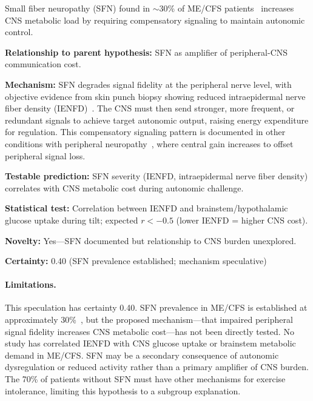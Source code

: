 \begin{speculation}
\label{spec:sfn-interface}
Small fiber neuropathy (SFN) found in $\sim$30\% of ME/CFS patients~\cite{Azcue2025sfn} increases CNS metabolic load by requiring compensatory signaling to maintain autonomic control.

\textbf{Relationship to parent hypothesis:} SFN as amplifier of peripheral-CNS communication cost.

\textbf{Mechanism:} SFN degrades signal fidelity at the peripheral nerve level, with objective evidence from skin punch biopsy showing reduced intraepidermal nerve fiber density (IENFD)~\cite{Oaklander2013sfn}. The CNS must then send stronger, more frequent, or redundant signals to achieve target autonomic output, raising energy expenditure for regulation. This compensatory signaling pattern is documented in other conditions with peripheral neuropathy~\cite{Oaklander2016autoimmuneSFN}, where central gain increases to offset peripheral signal loss.

\textbf{Testable prediction:} SFN severity (IENFD, intraepidermal nerve fiber density) correlates with CNS metabolic cost during autonomic challenge.

\textbf{Statistical test:} Correlation between IENFD and brainstem/hypothalamic glucose uptake during tilt; expected $r < -0.5$ (lower IENFD = higher CNS cost).

\textbf{Novelty:} Yes---SFN documented but relationship to CNS burden unexplored.

\textbf{Certainty:} 0.40 (SFN prevalence established; mechanism speculative)

\paragraph{Limitations.}
This speculation has certainty 0.40. SFN prevalence in ME/CFS is established at approximately 30\%~\cite{Azcue2025sfn}, but the proposed mechanism---that impaired peripheral signal fidelity increases CNS metabolic cost---has not been directly tested. No study has correlated IENFD with CNS glucose uptake or brainstem metabolic demand in ME/CFS. SFN may be a secondary consequence of autonomic dysregulation or reduced activity rather than a primary amplifier of CNS burden. The 70\% of patients without SFN must have other mechanisms for exercise intolerance, limiting this hypothesis to a subgroup explanation.
\end{speculation}

